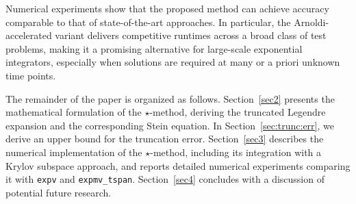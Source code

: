 \documentclass[final,1p,times,number]{elsarticle}
\theoremstyle{plain}%
\begin{document}
Numerical experiments show that the proposed method can achieve accuracy comparable to that of state-of-the-art approaches. In particular, the Arnoldi-accelerated variant delivers competitive runtimes across a broad class of test problems, making it a promising alternative for large-scale exponential integrators, especially when solutions are required at many or a priori unknown time points.

The remainder of the paper is organized as follows. Section~\ref{sec2} presents the mathematical formulation of the $\star$-method, deriving the truncated Legendre expansion and the corresponding Stein equation. In Section~\ref{sec:trunc:err}, we derive an upper bound for the truncation error. Section~\ref{sec3} describes the numerical implementation of the $\star$-method, including its integration with a Krylov subspace approach, and reports detailed numerical experiments comparing it with \texttt{expv} and \texttt{expmv\_tspan}.
 Section~\ref{sec4} concludes with a discussion of potential future research.
\end{document}
